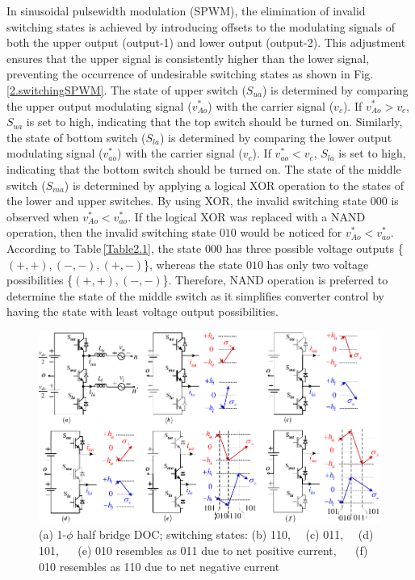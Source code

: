 In sinusoidal pulsewidth modulation (SPWM), the elimination of invalid switching states is achieved by introducing offsets to the modulating signals of both the upper output (output-1) and lower output (output-2). This adjustment ensures that the upper signal is consistently higher than the lower signal, preventing the occurrence of undesirable switching states \cite{4348103} as shown in Fig.\,\ref{2.switchingSPWM}. The state of upper switch ($S_{ua}$) is determined by comparing the upper output modulating signal ($v^{*}_{Ao}$) with the carrier signal ($v_c$). If $v^{*}_{Ao} > v_{c}$, $S_{ua}$ is set to high, indicating that the top switch should be turned on. Similarly, the state of bottom switch ($S_{la}$) is determined by comparing the lower output modulating signal ($v^{*}_{ao}$) with the carrier signal ($v_c$). If $v^{*}_{ao} < v_{c}$, $S_{la}$ is set to high, indicating that the bottom switch should be turned on. The state of the middle switch ($S_{ma}$) is determined by applying a logical XOR operation to the states of the lower and upper switches. By using XOR, the invalid switching state $000$ is observed when $v^{*}_{Ao} < v^{*}_{ao}$. If the logical XOR was replaced with a NAND operation, then the invalid switching state $010$ would be noticed for $v^{*}_{Ao} < v^{*}_{ao}$. According to Table\,\ref{Table2.1}, the state $000$ has three possible voltage outputs \{$(+,+),(-,-),(+,-)$\}, whereas the state $010$ has only two voltage possibilities \{$(+,+),(-,-)$\}. Therefore, NAND operation is preferred to determine the state of the middle switch as it simplifies converter control by having the state with least voltage output possibilities.
\begin{figure}[ht]
	\centering	
	\includegraphics[scale=1]{figures/Chapter_1_2/Direct_modul}
	\caption{(a) 1-$\phi$ half bridge DOC; switching states: (b) 110, ~~(c) 011, ~~(d) 101, ~~ (e) 010 resembles as 011 due to net positive current, ~~ (f) 010 resembles as 110 due to net negative current }
	\label{2.direct_modul}
\end{figure}


